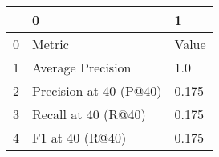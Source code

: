\begin{tabular}{lll}
\toprule
{} &                       0 &      1 \\
\midrule
0 &                  Metric &  Value \\
1 &       Average Precision &    1.0 \\
2 &  Precision at 40 (P@40) &  0.175 \\
3 &     Recall at 40 (R@40) &  0.175 \\
4 &         F1 at 40 (R@40) &  0.175 \\
\bottomrule
\end{tabular}
